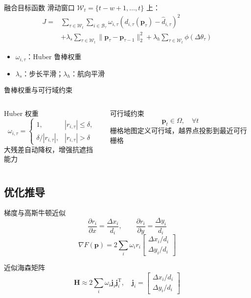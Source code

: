 \documentclass[aspectratio=169]{beamer}
\newcommand{\T}{\mathrm{T}}
\begin{document}
\begin{frame}{融合目标函数}
  滑动窗口 $\mathcal W_t=\{t-w+1,\dots,t\}$ 上：
  \small
  \begin{align*}
    J=&\sum_{\tau\in\mathcal W_t}\sum_{i\in\mathcal B_\tau}
    \omega_{i,\tau}\left(d_{i,\tau}(\bm p_\tau)-\hat d_{i,\tau}\right)^2 \\
    &+\lambda_s\sum_{\tau\in\mathcal W_t}\|\bm p_\tau-\bm p_{\tau-1}\|_2^2
    +\lambda_h\sum_{\tau\in\mathcal W_t}\phi(\Delta\theta_\tau)
  \end{align*}
  \normalsize
  \begin{itemize}
    \item $\omega_{i,\tau}$：Huber 鲁棒权重
    \item $\lambda_s$：步长平滑；$\lambda_h$：航向平滑
  \end{itemize}
\end{frame}

\begin{frame}{鲁棒权重与可行域约束}
  \begin{columns}[T]
    \begin{block}{Huber 权重}
      \[
        \omega_{i,\tau}=
        \begin{cases}
          1, & |r_{i,\tau}| \le \delta,\\
          \delta/|r_{i,\tau}|, & |r_{i,\tau}|>\delta
        \end{cases}
      \]
      大残差自动降权，增强抗遮挡能力
    \end{block}
    \begin{block}{可行域约束}
      \[
        \bm p_t\in\Omega,\quad \forall t
      \]
      栅格地图定义可行域，越界点投影到最近可行栅格
    \end{block}
  \end{columns}
\end{frame}

\subsection{优化推导}

\begin{frame}{梯度与高斯牛顿近似}
  \[
    \frac{\partial r_i}{\partial x}=\frac{\Delta x_i}{d_i},\qquad
    \frac{\partial r_i}{\partial y}=\frac{\Delta y_i}{d_i}
  \]
  \[
    \nabla F(\bm p)=2\sum_i \omega_i r_i
    \begin{bmatrix}
      \Delta x_i/d_i\\
      \Delta y_i/d_i
    \end{bmatrix}
  \]
  \begin{block}{近似海森矩阵}
    \[
      \bm H \approx 2\sum_i \omega_i \bm j_i\bm j_i^{\T},
      \quad \bm j_i=\begin{bmatrix}\Delta x_i/d_i\\ \Delta y_i/d_i\end{bmatrix}
    \]
  \end{block}
\end{frame}
\end{document}
